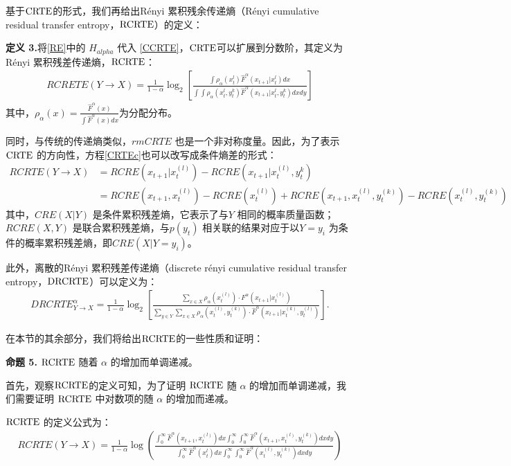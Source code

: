 基于$\rm{CRTE}$的形式，我们再给出R\'{e}nyi 累积残余传递熵（R\'{e}nyi cumulative residual transfer entropy，$\rm{RCRTE}$）的定义：

\textbf{定义 3.}将\ref{RE}中的 $H_{alpha}$ 代入 \ref{CCRTE}，$\rm{CRTE}$可以扩展到分数阶，其定义为 R\'{e}nyi 累积残差传递熵，$\rm{RCRTE}$：
\begin{align}\label{CRTEc}
RCRETE(Y \rightarrow X) = \frac{1}{{1 - \alpha}} \log_{2} \left[ \frac{\int  \rho_{\alpha}(x_t^l)  \hat F^{\alpha}(x_{t+1} | x_t^l)  dx }{\int \int \rho_{\alpha}(x_t^l, y_t^k)  \hat F^{\alpha}(x_{t+1} | x_t^l, y_t^k)  dx  dy} \right]
\end{align}
其中，$\rho_{\alpha}(x)=\frac{\hat F^{\alpha}(x)}{\int\hat F^{\alpha}(x)dx}$为分配分布。

同时，与传统的传递熵类似，$rm{CRTE}$ 也是一个非对称度量。因此，为了表示 $\rm{CRTE}$ 的方向性，方程\ref{CRTEc}也可以改写成条件熵差的形式：
\begin{align}\label{CCRTE}
RCRTE(Y \rightarrow X) &= RCRE(x_{t+1}|x_{t}^{(l)})-RCRE(x_{t+1}|x_{t}^{(l)},y_{t}^{k})\\
&=RCRE(x_{t+1},x_{t}^{(l)})-RCRE(x_{t}^{(l)})+RCRE(x_{t+1},x_{t}^{(l)},y_{t}^{(k)})-RCRE(x_{t}^{(l)},y_{t}^{(k)})
\end{align}
其中，$CRE(X|Y)$ 是条件累积残差熵，它表示了与$Y$ 相同的概率质量函数；$RCRE(X,Y)$ 是联合累积残差熵，与$p(y_{t})$ 相关联的结果对应于以$Y=y_{i}$ 为条件的概率累积残差熵，即$CRE(X|Y=y_{i})$。

此外，离散的R\'{e}nyi 累积残差传递熵（discrete r\'{e}nyi cumulative residual transfer entropy，$\rm{DRCRTE}$）可以定义为：
\begin{align}
DRCRTE_{Y \rightarrow X}^\alpha = \frac{1}{{1 - \alpha}} \log_{2} \left[ \frac{\sum\limits_{x\in X} \rho_{\alpha}(x_{t}^{(l)}) \cdot F^{\alpha}(x_{t+1}|x_t^{(l)}) }{\sum\limits_{y\in Y} \sum\limits_{x\in X} \rho_{\alpha}(x_{t}^{(l)}, y_{t}^{(k)}) \cdot \hat F^{\alpha}(x_{t+1}|x_t^{(k)}, y_{t}^{(l)})} \right].
\end{align}

在本节的其余部分，我们将给出$\rm{RCRTE}$的一些性质和证明：

\textbf{命题 5.} $\rm{RCRTE}$ 随着 $\alpha$ 的增加而单调递减。

首先，观察$\rm{RCRTE}$的定义可知，为了证明 $\rm{RCRTE}$ 随 $\alpha$ 的增加而单调递减，我们需要证明 $\rm{RCRTE}$ 中对数项的随 $\alpha$ 的增加而递减。

$\rm{RCRTE}$ 的定义公式为：
\begin{align*}
RCRTE(Y \rightarrow X) = \frac{1}{1-\alpha} \log \left( \frac{\int_{0}^{\infty}\hat F^{\alpha}(x_{t+1},x_{t}^{(l)})dx \int_{0}^{\infty}\int_{0}^{\infty}\hat F^{\alpha}(x_{t+1},x_{t}^{(l)},y_{t}^{(k)})dxdy}{\int_{0}^{\infty}\hat F^{\alpha}(x_{t}^{l})dx \int_{0}^{\infty}\int_{0}^{\infty}\hat F^{\alpha}(x_{t}^{(l)},y_{t}^{(k)})dxdy} \right)
\end{align*}

